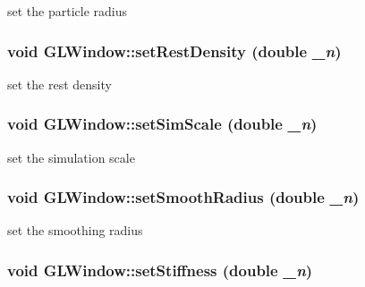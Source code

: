 set the particle radius \hypertarget{classGLWindow_a5fe8b8b15ff2eab19739095cbfd53a47}{
\subsubsection[{setRestDensity}]{\setlength{\rightskip}{0pt plus 5cm}void GLWindow::setRestDensity (double {\em \_\-n})}}
\label{classGLWindow_a5fe8b8b15ff2eab19739095cbfd53a47}


set the rest density \hypertarget{classGLWindow_a372a9f24fa394a1bd4863c2aa4d9f730}{
\subsubsection[{setSimScale}]{\setlength{\rightskip}{0pt plus 5cm}void GLWindow::setSimScale (double {\em \_\-n})}}
\label{classGLWindow_a372a9f24fa394a1bd4863c2aa4d9f730}


set the simulation scale \hypertarget{classGLWindow_a8573e617bde70803701f8163bd994683}{
\subsubsection[{setSmoothRadius}]{\setlength{\rightskip}{0pt plus 5cm}void GLWindow::setSmoothRadius (double {\em \_\-n})}}
\label{classGLWindow_a8573e617bde70803701f8163bd994683}


set the smoothing radius \hypertarget{classGLWindow_a1720ed224d1b63fe1541c62bc2decc9b}{
\subsubsection[{setStiffness}]{\setlength{\rightskip}{0pt plus 5cm}void GLWindow::setStiffness (double {\em \_\-n})}}
\label{classGLWindow_a1720ed224d1b63fe1541c62bc2decc9b}


